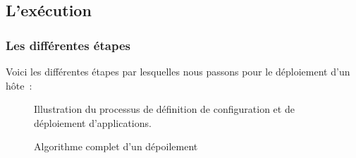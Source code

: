 \subsection{L'exécution}

\subsubsection{Les différentes étapes}

Voici les différentes étapes par lesquelles nous passons pour le déploiement d'un hôte~:

\begin{figure}
	\centerfloat
	\caption{Illustration du processus de définition de configuration et de déploiement d'applications.}
	\label{1.4_definition_runlist}
	
\end{figure}

\begin{figure}
	\centerfloat
	\caption{Algorithme complet d'un dépoilement}
	\label{1.4_algorithme_complet}
	
\end{figure}

